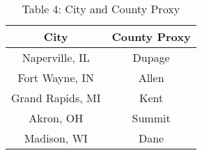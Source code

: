 \documentclass{article}
\begin{document}
\begin{table}[ht]
\centering
\caption*{Table 4: City and County Proxy}
\begin{tabular}{cc}
	City & County Proxy\\
\hline
	Naperville, IL & Dupage\\
	Fort Wayne, IN & Allen\\
	Grand Rapids, MI & Kent\\
	Akron, OH & Summit\\
	Madison, WI & Dane\\
\hline
\end{tabular}
\end{table}
\end{document}
